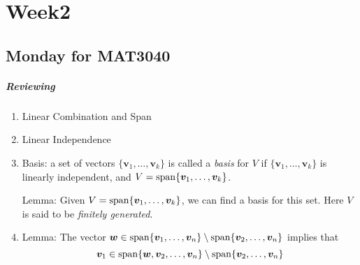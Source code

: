 
\chapter{Week2}
\section{Monday for MAT3040}
\paragraph{Reviewing}
\begin{enumerate}
\item
Linear Combination and Span
\item
Linear Independence
\item
Basis: a set of vectors $\{\bm v_1,\dots,\bm v_k\}$ is called a \emph{basis} for $V$ if $\{\bm v_1,\dots,\bm v_k\}$ is linearly independent, and $V=\operatorname{span}\{\bm v_1,\dots,\bm v_k\}$.

Lemma: Given $V=\operatorname{span}\{\bm v_1,\dots,\bm v_k\}$, 
we can find a basis for this set. 
Here $V$ is said to be \emph{finitely generated}.
\item
Lemma: The vector $\bm w\in\operatorname{span}\{\bm v_1,\dots,\bm v_n\}\setminus\operatorname{span}\{\bm v_2,\dots,\bm v_n\}$ implies that 
\[
\bm v_1\in\operatorname{span}\{\bm w,\bm v_2,\dots,\bm v_n\}\setminus\operatorname{span}\{\bm v_2,\dots,\bm v_n\}
\]
\end{enumerate}
